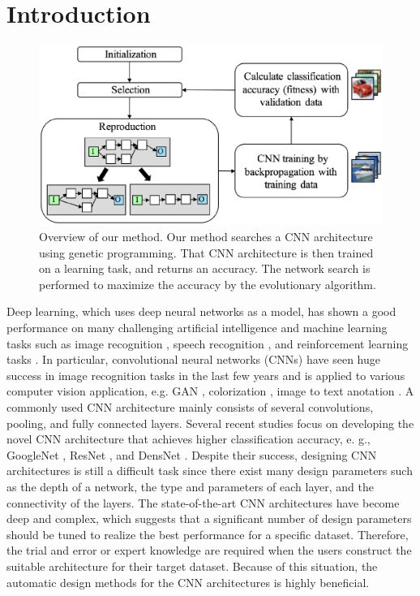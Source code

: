 
\section{Introduction}

\begin{figure}[t]
\includegraphics[scale=0.45]{images/overview.eps}
\caption{Overview of our method. Our method searches a CNN architecture using genetic programming. That CNN architecture is then trained on a learning task, and returns an accuracy. The network search is performed to maximize the accuracy by the evolutionary algorithm.}
\label{overview}
\end{figure}

Deep learning, which uses deep neural networks as a model, has shown a good performance on many challenging artificial intelligence and machine learning tasks such as image recognition \cite{lecun_gradient-based_1998,krizhevsky_imagenet_2012}, speech recognition \cite{hinton_deep_2012}, and reinforcement learning tasks \cite{mnih_playing_2013,mnih_human-level_2015}.
In particular, convolutional neural networks (CNNs) \cite{lecun_gradient-based_1998} have seen huge success in image recognition tasks in the last few years and is applied to various computer vision application, e.g. GAN \cite{goodfellow_generative_2014}, colorization \cite{zhang_colorful_2016}, image to text anotation \cite{vinyals_show_2015}.
A commonly used CNN architecture mainly consists of several convolutions, pooling, and fully connected layers.
Several recent studies focus on developing the novel CNN architecture that achieves higher classification accuracy, e. g., GoogleNet \cite{szegedy_going_2015}, ResNet \cite{he_deep_2016}, and DensNet \cite{huang_densely_2016}.
Despite their success, designing CNN architectures is still a difficult task since there exist many design parameters such as the depth of a network, the type and parameters of each layer, and the connectivity of the layers.
The state-of-the-art CNN architectures have become deep and complex, which suggests that a significant number of design parameters should be tuned to realize the best performance for a specific dataset.
Therefore, the trial and error or expert knowledge are required when the users construct the suitable architecture for their target dataset.
Because of this situation, the automatic design methods for the CNN architectures is highly beneficial.

